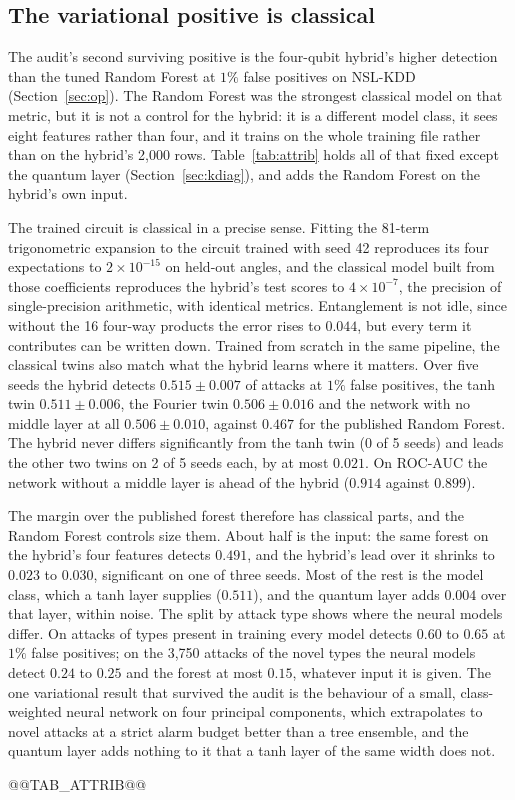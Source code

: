 \subsection{The variational positive is classical}\label{sec:kattr}
The audit's second surviving positive is the four-qubit hybrid's higher detection than the tuned Random
Forest at $1\%$ false positives on NSL-KDD (Section~\ref{sec:op}). The Random Forest was the strongest
classical model on that metric, but it is not a control for the hybrid: it is a different model class,
it sees eight features rather than four, and it trains on the whole training file rather than on the
hybrid's 2{,}000 rows. Table~\ref{tab:attrib} holds all of that fixed except the quantum layer
(Section~\ref{sec:kdiag}), and adds the Random Forest on the hybrid's own input.

The trained circuit is classical in a precise sense. Fitting the 81-term trigonometric expansion to the
circuit trained with seed 42 reproduces its four expectations to $2\times10^{-15}$ on held-out angles, and
the classical model built from those coefficients reproduces the hybrid's test scores to $4\times10^{-7}$,
the precision of single-precision arithmetic, with identical metrics. Entanglement is not idle, since
without the 16 four-way products the error rises to $0.044$, but every term it contributes can be written
down. Trained from scratch in the same pipeline, the classical twins also match what the hybrid learns
where it matters. Over five seeds the hybrid detects $0.515\pm0.007$ of attacks at $1\%$ false positives,
the tanh twin $0.511\pm0.006$, the Fourier twin $0.506\pm0.016$ and the network with no middle layer at
all $0.506\pm0.010$, against $0.467$ for the published Random Forest. The hybrid never differs
significantly from the tanh twin (0 of 5 seeds) and leads the other two twins on 2 of 5 seeds each, by at
most $0.021$. On ROC-AUC the network without a middle layer is ahead of the hybrid ($0.914$ against
$0.899$).

The margin over the published forest therefore has classical parts, and the Random Forest controls size
them. About half is the input: the same forest on the hybrid's four features detects $0.491$, and the
hybrid's lead over it shrinks to $0.023$ to $0.030$, significant on one of three seeds. Most of the rest is
the model class, which a tanh layer supplies ($0.511$), and the quantum layer adds $0.004$ over that layer,
within noise. The split by attack type shows where the neural models differ. On attacks of types present
in training every model detects $0.60$ to $0.65$ at $1\%$ false positives; on the 3{,}750 attacks of the
novel types the neural models detect $0.24$ to $0.25$ and the forest at most $0.15$, whatever input it is
given. The one variational result that survived the audit is the behaviour of a small, class-weighted
neural network on four principal components, which extrapolates to novel attacks at a strict alarm
budget better than a tree ensemble, and the quantum layer adds nothing to it that a tanh layer of the
same width does not.

@@TAB_ATTRIB@@
